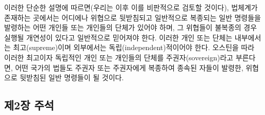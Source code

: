 이러한 단순한 설명에 따르면(우리는 이후 이를 비판적으로 검토할 것이다),
법체계가 존재하는 곳에서는 어디에나 위협으로 뒷받침되고 일반적으로
복종되는 일반 명령들을 발령하는 어떤 개인들 또는 개인들의 단체가 있어야
하며, 그 위협들이 불복종의 경우 실행될 개연성이 있다고 일반적으로
믿어져야 한다. 이러한 개인 또는 단체는 내부에서는 최고(supreme)이며
외부에서는 독립(independent)적이어야 한다. 오스틴을 따라 이러한 최고이자
독립적인 개인 또는 개인들의 단체를 주권자(sovereign)라고 부른다면, 어떤
국가의 법들도 주권자 또는 주권자에게 복종하여 종속된 자들이 발령한,
위협으로 뒷받침된 일반 명령들이 될 것이다.

\newpage

\subsection{제2장 주석}\label{uxc81c2uxc7a5-uxc8fcuxc11d}


